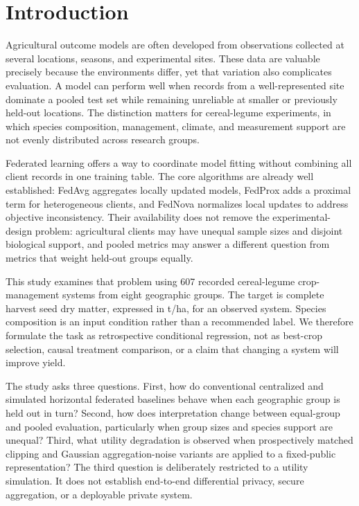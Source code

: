 \documentclass[journal]{IEEEtran}
\begin{document}
\section{Introduction}

Agricultural outcome models are often developed from observations collected at
several locations, seasons, and experimental sites. These data are valuable
precisely because the environments differ, yet that variation also complicates
evaluation. A model can perform well when records from a well-represented site
dominate a pooled test set while remaining unreliable at smaller or previously
held-out locations. The distinction matters for cereal-legume experiments, in
which species composition, management, climate, and measurement support are
not evenly distributed across research groups.

Federated learning offers a way to coordinate model fitting without combining
all client records in one training table. The core algorithms are already well
established: FedAvg \cite{mcmahan2017communication} aggregates locally updated
models, FedProx \cite{li2020fedprox} adds a proximal term for heterogeneous
clients, and FedNova \cite{wang2020fednova} normalizes local updates to address
objective inconsistency. Their availability does not remove the
experimental-design problem: agricultural clients may have unequal sample sizes
and disjoint biological support, and pooled metrics may answer a different
question from metrics that weight held-out groups equally.

This study examines that problem using 607 recorded cereal-legume
crop-management systems from eight geographic groups. The target is complete
harvest seed dry matter, expressed in t/ha, for an observed system. Species
composition is an input condition rather than a recommended label. We therefore
formulate the task as retrospective conditional regression, not as best-crop
selection, causal treatment comparison, or a claim that changing a system will
improve yield.

The study asks three questions. First, how do conventional centralized and
simulated horizontal federated baselines behave when each geographic group is
held out in turn? Second, how does interpretation change between equal-group
and pooled evaluation, particularly when group sizes and species support are
unequal? Third, what utility degradation is observed when prospectively matched
clipping and Gaussian aggregation-noise variants are applied to a fixed-public
representation? The third question is deliberately restricted to a utility
simulation. It does not establish end-to-end differential privacy, secure
aggregation, or a deployable private system.
\end{document}
